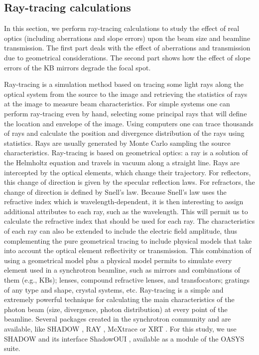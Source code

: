\documentclass{iucr}              %
\newcommand{\inred}[1]{{\color{black}#1}}
\begin{document}
\subsection{Ray-tracing calculations}
\label{level1}
In this section, we perform ray-tracing calculations to study the effect of real optics (including aberrations and slope errors) upon the beam size and beamline transmission. The first part deals with the effect of aberrations and transmission due to geometrical considerations. The second part shows how the effect of slope errors of the KB mirrors degrade the focal spot.  

Ray-tracing is a simulation method based on tracing some light rays along the optical system from the source to the image and retrieving the statistics of rays at the image to measure beam characteristics. For simple systems one can perform ray-tracing even by hand, selecting some principal rays that will define the location and envelope of the image. Using computers one can trace thousands of rays and calculate the position and divergence distribution of the rays using statistics. Rays are usually generated by Monte Carlo sampling the source characteristics. Ray-tracing is based on geometrical optics: a ray is a solution of the Helmholtz equation and travels in vacuum along a straight line. Rays are intercepted by the optical elements, which change their trajectory. For reflectors, this change of direction is given by the specular reflection laws. For refractors, the change of direction is defined by  Snell's law. Because Snell's law uses the refractive index which is wavelength-dependent, it is then interesting to assign additional attributes to each ray, such as the wavelength. This will permit us to calculate the refractive index that should be used for each ray. The characteristics of each ray can also be extended to include the electric field amplitude\inred{, thus complementing} the pure geometrical tracing to include physical models that take into account the optical element reflectivity or transmission. This combination of using a geometrical model plus a physical model \inred{permits to simulate} every element used in a synchrotron beamline, such as mirrors and combinations of them (e.g., KBs); lenses, compound refractive lenses, and transfocators; gratings of any type and shape, crystal systems, etc. Ray-tracing is a simple and extremely powerful technique for calculating the main characteristics of the photon beam (size, divergence, photon distribution) at every point of the beamline. 
Several packages created in the synchrotron community and are available, like SHADOW \cite{codeSHADOW}, RAY \cite{codeRAY}, McXtrace \cite{codeMCXTRACE} or XRT \cite{codeXRT}. For this study, we use SHADOW and its interface ShadowOUI \cite{codeSHADOWOUI}, available as a module of the OASYS suite.
\end{document}
